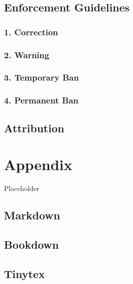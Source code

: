 \documentclass[
  fontsize=13pt,
  english,
  a4paper,
  openany, a4paper, oneside]{book}
\begin{document}
\hypertarget{enforcement-guidelines}{%
\section{Enforcement Guidelines}\label{enforcement-guidelines}}

\hypertarget{correction}{%
\subsection{1. Correction}\label{correction}}

\hypertarget{warning}{%
\subsection{2. Warning}\label{warning}}

\hypertarget{temporary-ban}{%
\subsection{3. Temporary Ban}\label{temporary-ban}}

\hypertarget{permanent-ban}{%
\subsection{4. Permanent Ban}\label{permanent-ban}}

\hypertarget{attribution}{%
\section{Attribution}\label{attribution}}

\hypertarget{appendix}{%
\chapter{Appendix}\label{appendix}}

Placeholder

\hypertarget{markdown-1}{%
\section{Markdown}\label{markdown-1}}

\hypertarget{bookdown}{%
\section{Bookdown}\label{bookdown}}

\hypertarget{tinytex}{%
\section{Tinytex}\label{tinytex}}

  
\end{document}
